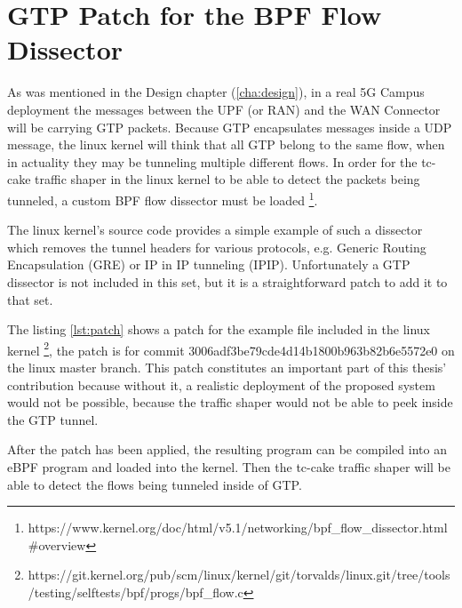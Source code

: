 

\cleardoublepage
\chapter{GTP Patch for the BPF Flow Dissector}
\label{appendix:patch}

As was mentioned in the Design chapter (\ref{cha:design}), in a real 5G Campus deployment the messages between the UPF (or RAN) and the WAN Connector will be carrying GTP packets. Because GTP encapsulates messages inside a UDP message, the linux kernel will think that all GTP belong to the same flow, when in actuality they may be tunneling multiple different flows. In order for the tc-cake traffic shaper in the linux kernel to be able to detect the packets being tunneled, a custom BPF flow dissector must be loaded \footnote{https://www.kernel.org/doc/html/v5.1/networking/bpf\_flow\_dissector.html\#overview}.

The linux kernel's source code provides a simple example of such a dissector which removes the tunnel headers for various protocols, e.g. Generic Routing Encapsulation (GRE) or IP in IP tunneling (IPIP). Unfortunately a GTP dissector is not included in this set, but it is a straightforward patch to add it to that set.

The listing \ref{lst:patch} shows a patch for the example file included in the linux kernel \footnote{https://git.kernel.org/pub/scm/linux/kernel/git/torvalds/linux.git/tree/tools/testing/selftests/bpf/progs/bpf\_flow.c}, the patch is for commit 3006adf3be79cde4d14b1800b963b82b6e5572e0 on the linux master branch. This patch constitutes an important part of this thesis' contribution because without it, a realistic deployment of the proposed system would not be possible, because the traffic shaper would not be able to peek inside the GTP tunnel.

After the patch has been applied, the resulting program can be compiled into an eBPF program and loaded into the kernel. Then the tc-cake traffic shaper will be able to detect the flows being tunneled inside of GTP.

\clearpage

